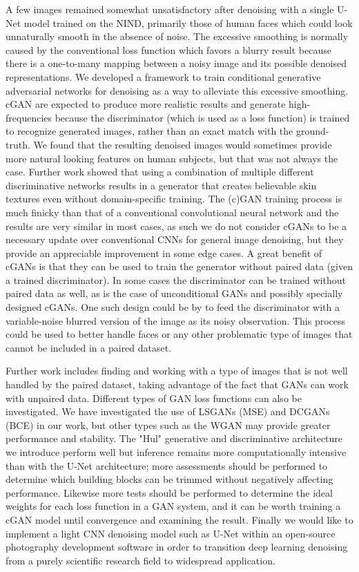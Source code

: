 A few images remained somewhat unsatisfactory after denoising with a single U-Net model trained on the \ac{NIND}, primarily those of human faces which could look unnaturally smooth in the absence of noise. The excessive smoothing is normally caused by the conventional loss function which favors a blurry result because there is a one-to-many mapping between a noisy image and its possible denoised representations. We developed a framework to train conditional generative adversarial networks for denoising as a way to alleviate this excessive smoothing. \ac{cGAN} are expected to produce more realistic results and generate high-frequencies because the discriminator (which is used as a loss function) is trained to recognize generated images, rather than an exact match with the ground-truth. We found that the resulting denoised images would sometimes provide more natural looking features on human subjects, but that was not always the case. Further work showed that using a combination of multiple different discriminative networks results in a generator that creates believable skin textures even without domain-specific training. The (c)\ac{GAN} training process is much finicky than that of a conventional convolutional neural network and the results are very similar in most cases, as such we do not consider \acp{cGAN} to be a necessary update over conventional \acp{CNN} for general image denoising, but they provide an appreciable improvement in some edge cases. A great benefit of \acp{cGAN} is that they can be used to train the generator without paired data (given a trained discriminator). In some cases the discriminator can be trained without paired data as well, as is the case of unconditional \acp{GAN} and possibly specially designed \acp{cGAN}. One such design could be by to feed the discriminator with a variable-noise blurred version of the image as its noisy observation. This process could be used to better handle faces or any other problematic type of images that cannot be included in a paired dataset.

Further work includes finding and working with a type of images that is not well handled by the paired dataset, taking advantage of the fact that \acp{GAN} can work with unpaired data. Different types of \ac{GAN} loss functions can also be investigated. We have investigated the use of \acp{LSGAN} (\ac{MSE}) and \acp{DCGAN} (\ac{BCE}) in our work, but other types such as the \ac{WGAN} may provide greater performance and stability. The "Hul" generative and discriminative architecture we introduce perform well but inference remains more computationally intensive than with the U-Net architecture; more assessments should be performed to determine which building blocks can be trimmed without negatively affecting performance. Likewise more tests should be performed to determine the ideal weights for each loss function in a \ac{GAN} system, and it can be worth training a \ac{cGAN} model until convergence and examining the result. Finally we would like to implement a light \ac{CNN} denoising model such as U-Net within an open-source photography development software in order to transition deep learning denoising from a purely scientific research field to widespread application.



